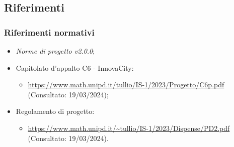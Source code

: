\subsection{Riferimenti}

\subsubsection{Riferimenti normativi}
\begin{itemize}
    \item \textit{Norme di progetto v2.0.0};
    \item Capitolato d'appalto C6 - InnovaCity:
    \begin{itemize}
        \item \url{https://www.math.unipd.it/tullio/IS-1/2023/Progetto/C6p.pdf} (Consultato: 19/03/2024);
    \end{itemize}
    \item Regolamento di progetto:
    \begin{itemize}
        \item \url{https://www.math.unipd.it/~tullio/IS-1/2023/Dispense/PD2.pdf} (Consultato: 19/03/2024).
    \end{itemize}
\end{itemize}


